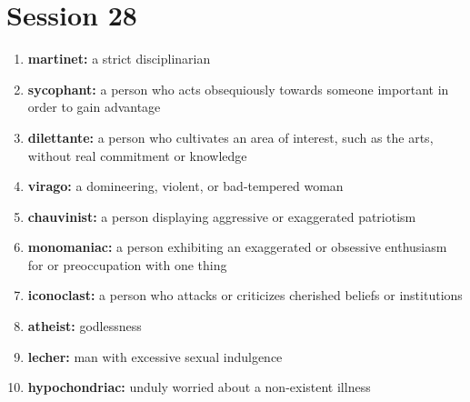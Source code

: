 \documentclass{article}
\begin{document}
\section{Session 28}
\begin{enumerate}
    \item \textbf{martinet: }{a strict disciplinarian}
    \item \textbf{sycophant: }{a person who acts obsequiously towards someone important in order to gain advantage}
    \item \textbf{dilettante: }{a person who cultivates an area of interest, such as the arts, without real commitment or knowledge}
    \item \textbf{virago: }{a domineering, violent, or bad-tempered woman}
    \item \textbf{chauvinist: }{a person displaying aggressive or exaggerated patriotism}
    \item \textbf{monomaniac: }{a person exhibiting an exaggerated or obsessive enthusiasm for or preoccupation with one thing}
    \item \textbf{iconoclast: }{a person who attacks or criticizes cherished beliefs or institutions}
    \item \textbf{atheist: }{godlessness}
    \item \textbf{lecher: }{man with excessive sexual indulgence}
    \item \textbf{hypochondriac: }{unduly worried about a non-existent illness}
    
\end{enumerate}
\end{document}
